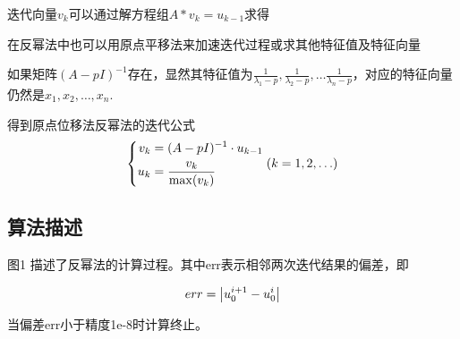 \documentclass[12pt, a4paper, oneside]{ctexart}
\begin{document}
	迭代向量$v_k$可以通过解方程组$A*v_k = u_{k-1}$求得
	
	在反幂法中也可以用原点平移法来加速迭代过程或求其他特征值及特征向量
	
	如果矩阵$(A-pI)^{-1}$存在，显然其特征值为$\frac{1}{{\lambda_1 - p}}
	, \frac{1}{{\lambda_2 - p}} , \ldots \frac{1}{{\lambda_n - p}}
	$，对应的特征向量仍然是$x_1, x_2, \ldots, x_n$.
	
	得到原点位移法反幂法的迭代公式
	\begin{equation}
		\centering
		\left\{
		\begin{aligned}
			v_k &= (A-pI)^{-1} \cdot u_{k-1} \\
			u_k &= \frac{v_k}{\max(v_k)}
		\end{aligned}
		\right. (k = 1, 2, \ldots )
	\end{equation}
	
	
	\subsection{算法描述}
	图1 描述了反幂法的计算过程。其中err表示相邻两次迭代结果的偏差，即
	
	\begin{equation}
		\centering
		\begin{gathered}
			err = \left\lvert u_0^{i+1} - u_0^i \right\lvert
		\end{gathered}
	\end{equation}
	
	当偏差err小于精度1e-8时计算终止。
	
\end{document}
